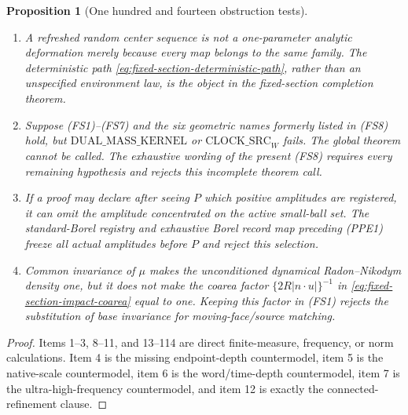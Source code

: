 \documentclass[11pt]{article}
\newtheorem{proposition}[theorem]{Proposition}
\begin{document}
\begin{proposition}[One hundred and fourteen obstruction tests]
\begin{enumerate}[label=\textup{(T\arabic*)}]
\item A refreshed random center sequence is not a one-parameter analytic
      deformation merely because every map belongs to the same family.
      The deterministic path \eqref{eq:fixed-section-deterministic-path},
      rather than an unspecified environment law, is the object in the
      fixed-section completion theorem.
\item Suppose \textup{(FS1)--(FS7)} and the six geometric names formerly
      listed in \textup{(FS8)} hold, but
      $\mathrm{DUAL\_MASS\_KERNEL}$ or
      $\mathrm{CLOCK\_SRC}_{W}$ fails.  The global theorem cannot be called.
      The exhaustive wording of the present \textup{(FS8)} requires every
      remaining hypothesis and rejects this incomplete theorem call.
\item If a proof may declare after seeing $P$ which positive amplitudes are
      registered, it can omit the amplitude concentrated on the active
      small-ball set.  The standard-Borel registry and exhaustive Borel
      record map preceding \textup{(PPE1)} freeze all actual amplitudes
      before $P$ and reject this selection.
\item Common invariance of $\mu$ makes the unconditioned dynamical
      Radon--Nikodym density one, but it does not make the coarea factor
      $\{2R|n\cdot u|\}^{-1}$ in
      \eqref{eq:fixed-section-impact-coarea} equal to one.  Keeping this
      factor in \textup{(FS1)} rejects the substitution of base invariance
      for moving-face/source matching.
\end{enumerate}
\end{proposition}

\begin{proof}
Items 1--3, 8--11, and 13--114 are direct finite-measure, frequency, or norm
calculations.  Item 4 is the missing endpoint-depth countermodel, item 5 is
the native-scale countermodel, item 6 is the word/time-depth countermodel,
item 7 is the ultra-high-frequency countermodel, and item 12 is exactly the
connected-refinement clause.
\end{proof}
\end{document}
